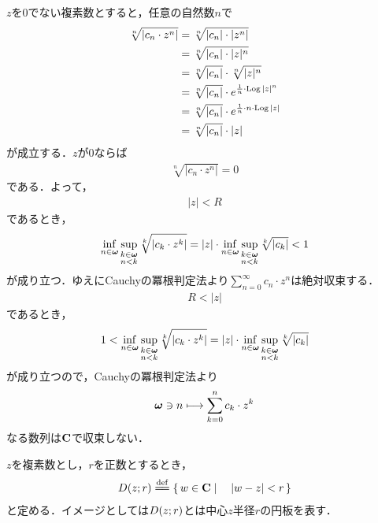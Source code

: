 	\begin{sketch}
		$z$を$0$でない複素数とすると，任意の自然数$n$で
		\begin{align}
			\sqrt[n]{|c_{n} \cdot z^{n}|}
			&= \sqrt[n]{|c_{n}| \cdot |z^{n}|} \\
			&= \sqrt[n]{|c_{n}| \cdot |z|^{n}} \\
			&= \sqrt[n]{|c_{n}|} \cdot \sqrt[n]{|z|^{n}} \\
			&= \sqrt[n]{|c_{n}|} \cdot e^{\frac{1}{n} \cdot \operatorname{Log}{|z|^{n}}} \\
			&= \sqrt[n]{|c_{n}|} \cdot e^{\frac{1}{n} \cdot n \cdot \operatorname{Log}{|z|}} \\
			&= \sqrt[n]{|c_{n}|} \cdot |z|
		\end{align}
		が成立する．$z$が$0$ならば
		\begin{align}
			\sqrt[n]{|c_{n} \cdot z^{n}|} = 0
		\end{align}
		である．よって，
		\begin{align}
			|z| < R
		\end{align}
		であるとき，
		\begin{align}
			\operatorname*{inf}_{n \in {\boldsymbol \omega}} \operatorname*{sup}_{\substack{k \in {\boldsymbol \omega} \\ n < k}} \sqrt[k]{|c_{k} \cdot z^{k}|}
			= |z| \cdot \operatorname*{inf}_{n \in {\boldsymbol \omega}} \operatorname*{sup}_{\substack{k \in {\boldsymbol \omega} \\ n < k}} \sqrt[k]{|c_{k}|}
			< 1
		\end{align}
		が成り立つ．ゆえにCauchyの冪根判定法より$\sum_{n=0}^{\infty} c_n \cdot z^n$は絶対収束する．
		\begin{align}
			R < |z|
		\end{align}
		であるとき，
		\begin{align}
			1 < \operatorname*{inf}_{n \in {\boldsymbol \omega}} \operatorname*{sup}_{\substack{k \in {\boldsymbol \omega} \\ n < k}} \sqrt[k]{|c_{k} \cdot z^{k}|}
			= |z| \cdot \operatorname*{inf}_{n \in {\boldsymbol \omega}} \operatorname*{sup}_{\substack{k \in {\boldsymbol \omega} \\ n < k}} \sqrt[k]{|c_{k}|}
		\end{align}
		が成り立つので，Cauchyの冪根判定法より
		\begin{align}
			{\boldsymbol \omega} \ni n \longmapsto \sum_{k=0}^{n} c_{k} \cdot z^{k}
		\end{align}
		なる数列は$\mathbf{C}$で収束しない．
		\QED
	\end{sketch}
	
	$z$を複素数とし，$r$を正数とするとき，
	\begin{align}
		\disc{z}{r} \defeq \Set{w \in \C}{|w - z| < r}
	\end{align}
	と定める．イメージとしては$D(z;r)$とは中心$z$半径$r$の円板を表す．
	
